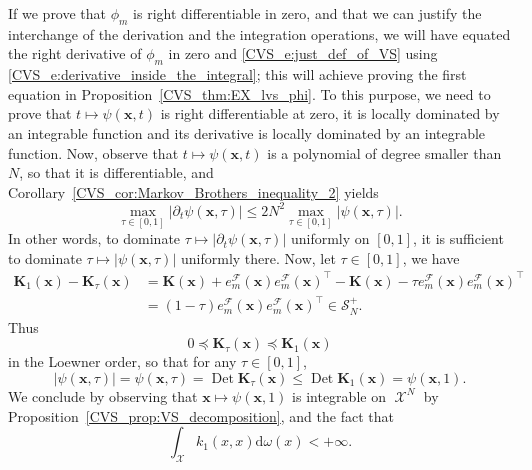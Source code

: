 \documentclass[twoside,11pt]{book}
\numberwithin{theorem}{chapter}
\numberwithin{definition}{chapter}
\numberwithin{proposition}{chapter}
\numberwithin{corollary}{chapter}
\numberwithin{example}{chapter}
\numberwithin{lemma}{chapter}
\numberwithin{assumption}{chapter}
\numberwithin{equation}{chapter}
\numberwithin{figure}{chapter}
\DeclareMathOperator{\Det}{Det}
\DeclareMathOperator{\Tran}{\intercal}
\DeclareMathOperator{\X}{\mathcal{X}}
\begin{document}
 If we prove that $\phi_{m}$ is right differentiable in zero, and that we can justify the interchange of the derivation and the integration operations, we will have equated the right derivative of $\phi_m$ in zero and \eqref{CVS_e:just_def_of_VS} using \eqref{CVS_e:derivative_inside_the_integral}; this will achieve proving the first equation in Proposition~\ref{CVS_thm:EX_lvs_phi}. To this purpose, we need to prove that $t \mapsto \psi(\bm{x},t)$ is right differentiable at zero, it is locally dominated by an integrable function and its derivative is locally dominated by an integrable function. Now, observe that $t \mapsto \psi(\bm{x},t)$ is a polynomial of degree smaller than $N$, so that it is differentiable, and Corollary~\ref{CVS_cor:Markov_Brothers_inequality_2} yields
\begin{equation}
\max_{\tau \in [0,1]} \left|\partial_t \psi(\bm{x},\tau)\right| \leq 2N^{2} \max_{\tau \in [0,1]} \left|\psi(\bm{x},\tau)\right|.
\end{equation}
 In other words, to dominate $\tau \mapsto |\partial_t \psi(\bm{x},\tau)|$ uniformly on $[0,1]$, it is sufficient to dominate $\tau \mapsto| \psi(\bm{x},\tau)|$ uniformly there. Now, let $\tau \in [0,1]$, we have
\begin{align}
\bm{K}_{1}(\bm{x}) - \bm{K}_{\tau}(\bm{x}) &  = \bm{K}(\bm{x}) + e_{m}^{\mathcal{F}}(\bm{x})e_{m}^{\mathcal{F}}(\bm{x})^{\Tran} - \bm{K}(\bm{x}) - \tau e_{m}^{\mathcal{F}}(\bm{x})e_{m}^{\mathcal{F}}(\bm{x})^{\Tran}\\
& = (1-\tau)e_{m}^{\mathcal{F}}(\bm{x})e_{m}^{\mathcal{F}}(\bm{x})^{\Tran} \in \mathcal{S}_{N}^{+}.
\end{align}
Thus
\begin{equation}
0\preceq \bm{K}_{\tau}(\bm{x}) \preceq \bm{K}_{1}(\bm{x})
\end{equation}
in the Loewner order, so that for any $\tau\in [0,1]$,
\begin{equation}
|\psi(\bm{x},\tau)| = \psi(\bm{x},\tau) =\Det \bm{K}_{\tau}(\bm{x}) \leq \Det \bm{K}_{1}(\bm{x}) = \psi(\bm{x},1) .
\end{equation}
We conclude by observing that $\bm{x} \mapsto \psi(\bm{x},1)$ is integrable on $\X^{N}$ by Proposition~\ref{CVS_prop:VS_decomposition}, and the fact that
\begin{equation}
\int_{\X} k_{1}(x,x) \mathrm{d}\omega(x) < +\infty.
\end{equation}
\end{document}
